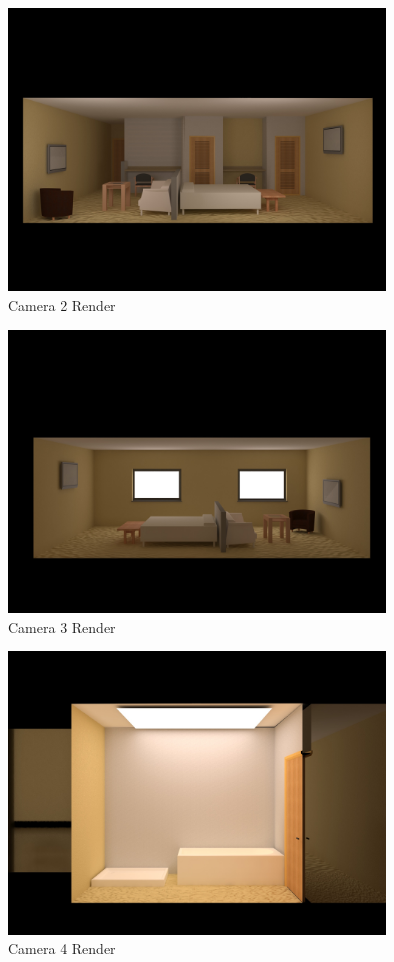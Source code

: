 \begin{figure}[hb]
	\centering
	\includegraphics[width=10cm]{img/HotelRoomCamera2.jpg}
	\caption{Camera 2 Render}
	\label{fig:Cam2}
\end{figure}

\begin{figure}[hb]
	\centering
	\includegraphics[width=10cm]{img/HotelRoomCamera3.jpg}
	\caption{Camera 3 Render}
	\label{fig:Cam3}
\end{figure}

\begin{figure}[hb]
	\centering
	\includegraphics[width=10cm]{img/HotelRoomCamera4.jpg}
	\caption{Camera 4 Render}
	\label{fig:Cam4}
\end{figure}

